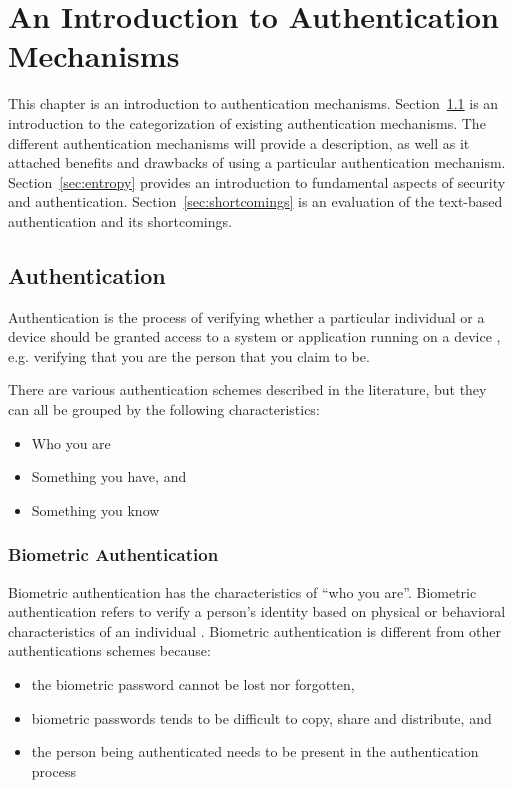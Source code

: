   \chapter{An Introduction to Authentication Mechanisms}
  \label{chap:background}
  
    This chapter is an introduction to authentication mechanisms. Section~\ref{sec:authentication} is an introduction to the categorization of existing authentication mechanisms. The different authentication mechanisms will provide a description, as well as it attached benefits and drawbacks of using a particular authentication mechanism. Section~\ref{sec:entropy} provides an introduction to fundamental aspects of security and authentication. Section~\ref{sec:shortcomings} is an evaluation of the text-based authentication and its shortcomings.

  \clearpage

  \section{Authentication} \label{sec:authentication}

  Authentication is the process of verifying whether a particular individual or a device should be granted access to a system or application running on a device \cite{IPAS}, e.g. verifying that you are the person that you claim to be.

  There are various authentication schemes described in the literature, but they can all be grouped by the following characteristics:

    \begin{itemize}
      \item Who you are
      \item Something you have, and
      \item Something you know
    \end{itemize}

    \subsection{Biometric Authentication}
    Biometric authentication has the characteristics of ``who you are''. Biometric authentication refers to verify a person's identity based on physical or behavioral characteristics of an individual \cite{biometrics, biometrics2}. Biometric authentication is different from other authentications schemes because:

      \begin{itemize}
        \item the biometric password cannot be lost nor forgotten,
        \item biometric passwords tends to be difficult to copy, share and distribute, and 
        \item the person being authenticated needs to be present in the authentication process
      \end{itemize} 

